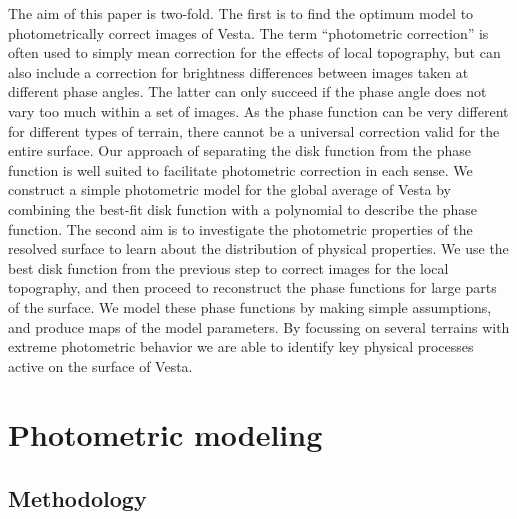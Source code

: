 \documentclass[3p,authoryear]{elsarticle}
\begin{document}
The aim of this paper is two-fold. The first is to find the optimum model to photometrically correct images of Vesta. The term ``photometric correction'' is often used to simply mean correction for the effects of local topography, but can also include a correction for brightness differences between images taken at different phase angles. The latter can only succeed if the phase angle does not vary too much within a set of images. As the phase function can be very different for different types of terrain, there cannot be a universal correction valid for the entire surface. Our approach of separating the disk function from the phase function is well suited to facilitate photometric correction in each sense. We construct a simple photometric model for the global average of Vesta by combining the best-fit disk function with a polynomial to describe the phase function. The second aim is to investigate the photometric properties of the resolved surface to learn about the distribution of physical properties. We use the best disk function from the previous step to correct images for the local topography, and then proceed to reconstruct the phase functions for large parts of the surface. We model these phase functions by making simple assumptions, and produce maps of the model parameters. By focussing on several terrains with extreme photometric behavior we are able to identify key physical processes active on the surface of Vesta.


\section{Photometric modeling}

\subsection{Methodology}
\end{document}
